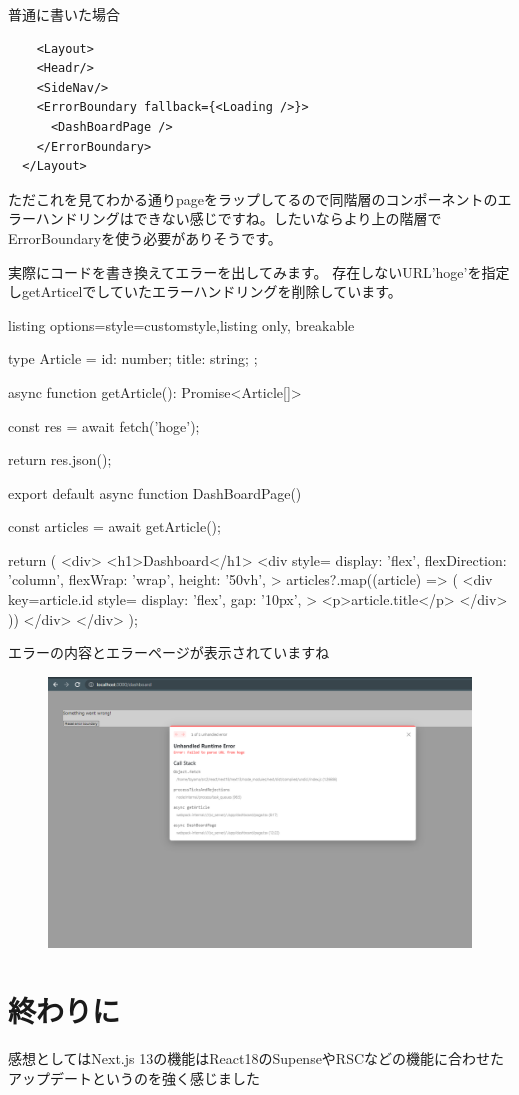 普通に書いた場合



\begin{tcolorbox}[breakable]
  \begin{verbatim}
    <Layout>
    <Headr/>
    <SideNav/>
    <ErrorBoundary fallback={<Loading />}>
      <DashBoardPage />
    </ErrorBoundary>
  </Layout>
  \end{verbatim}
\end{tcolorbox}


ただこれを見てわかる通りpageをラップしてるので同階層のコンポーネントのエラーハンドリングはできない感じですね。したいならより上の階層でErrorBoundaryを使う必要がありそうです。

実際にコードを書き換えてエラーを出してみます。
存在しないURL'hoge'を指定しgetArticelでしていたエラーハンドリングを削除しています。


\begin{tcblisting}{listing options={style=customstyle},listing only, breakable}

  type Article = {
  id: number;
  title: string;
  };

  async function getArticle(): Promise<Article[]> {
      const res = await fetch('hoge');

      return res.json();
    }

  export default async function DashBoardPage() {
  const articles = await getArticle();

  return (
  <div>
  <h1>Dashboard</h1>
  <div
  style={{
      display: 'flex',
      flexDirection: 'column',
      flexWrap: 'wrap',
      height: '50vh',
    }}
  >
  {articles?.map((article) => (
  <div
  key={article.id}
  style={{
      display: 'flex',
      gap: '10px',
    }}
  >
    <p>{article.title}</p>
  </div>
  ))}
  </div>
  </div>
  );
  }

\end{tcblisting}


エラーの内容とエラーページが表示されていますね


\begin{figure}[H]
  \centering
  \includegraphics[width=12cm]{./image/03-Tech/chap4/08.png}
\end{figure}



\section{終わりに}
感想としてはNext.js 13の機能はReact18のSupenseやRSCなどの機能に合わせたアップデートというのを強く感じました